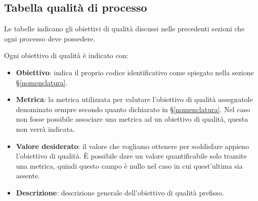 \subsection{Tabella qualità di processo}
Le tabelle indicano gli obiettivi di qualità discussi nelle precedenti sezioni che ogni processo deve possedere.

Ogni obiettivo di qualità è indicato con:

\begin{itemize}
	\item \textbf{Obiettivo}: indica il proprio codice identificativo come spiegato nella sezione \S\ref{nomenclatura}.
	\item \textbf{Metrica}: la metrica utilizzata per valutare l'obiettivo di qualità assegnatole denominato sempre secondo quanto dichiarato in \S\ref{nomenclatura}. Nel caso non fosse possibile associare una metrica ad un obiettivo di qualità, questa non verrà indicata.
	\item \textbf{Valore desiderato}: il valore che vogliamo ottenere per soddisfare appieno l'obiettivo di qualità. È possibile dare un valore quantificabile solo tramite una metrica, quindi questo campo è nullo nel caso in cui quest'ultima sia assente.
	\item \textbf{Descrizione}: descrizione generale dell'obiettivo di qualità prefisso.
\end{itemize}

\newcommand{\grigiodesc}{gray!15}

